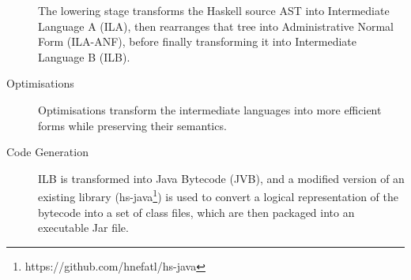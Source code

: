 \documentclass[dissertation.tex]{subfiles}
\begin{document}
\begin{description}
{    The lowering stage transforms the Haskell source AST into Intermediate Language A (ILA), then rearranges that
    tree into Administrative Normal Form (ILA-ANF), before finally transforming it into Intermediate Language B
    (ILB).

}
\item[Optimisations]
{
    \hfill

    Optimisations transform the intermediate languages into more efficient forms while preserving their semantics.


}
\item[Code Generation]
{
    \hfill

    ILB is transformed into Java Bytecode (JVB), and a modified version of an existing library
    (hs-java\footnote{https://github.com/hnefatl/hs-java}) is used to convert a logical representation of the
    bytecode into a set of class files, which are then packaged into an executable Jar file.

}
\end{description}
\end{document}
